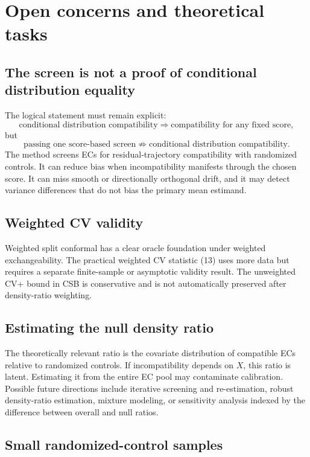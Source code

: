 \documentclass[11pt]{article}
\begin{document}
\section{Open concerns and theoretical tasks}

\subsection{The screen is not a proof of conditional distribution equality}

The logical statement must remain explicit:
\[
\text{conditional distribution compatibility}
\Longrightarrow
\text{compatibility for any fixed score},
\]
but
\[
\text{passing one score-based screen}
\not\Longrightarrow
\text{conditional distribution compatibility}.
\]
The method screens ECs for residual-trajectory compatibility with randomized controls. It can reduce bias when incompatibility manifests through the chosen score. It can miss smooth or directionally orthogonal drift, and it may detect variance differences that do not bias the primary mean estimand.

\subsection{Weighted CV validity}

Weighted split conformal has a clear oracle foundation under weighted exchangeability. The practical weighted CV statistic (13) uses more data but requires a separate finite-sample or asymptotic validity result. The unweighted CV+ bound in CSB is conservative and is not automatically preserved after density-ratio weighting.

\subsection{Estimating the null density ratio}

The theoretically relevant ratio is the covariate distribution of compatible ECs relative to randomized controls. If incompatibility depends on $X$, this ratio is latent. Estimating it from the entire EC pool may contaminate calibration. Possible future directions include iterative screening and re-estimation, robust density-ratio estimation, mixture modeling, or sensitivity analysis indexed by the difference between overall and null ratios.

\subsection{Small randomized-control samples}
\end{document}

